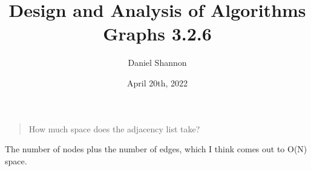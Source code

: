 \documentclass[12pt, letterpaper, twoside]{article}
\title{%
Design and Analysis of Algorithms\\
\large Graphs 3.2.6
}
\author{Daniel Shannon}
\date{April 20th, 2022}
\begin{document}
\begin{titlepage}
\maketitle
\end{titlepage}
\begin{quote}
How much space does the adjacency list take?
\end{quote}
The number of nodes plus the number of edges, which I think comes out to O(N) space.
\end{document}
